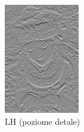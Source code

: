 \begin{figure}[ht]
\begin{minipage}[t]{0.35\linewidth}
        \includegraphics[width=\linewidth]{Rozdziały/02.Podstawy_teoretyczne/Obrazy/level_1_decomposition_LH.png}
        \caption{LH (poziome detale)}
        \label{fig:image43}
    \end{minipage}
\end{figure}

